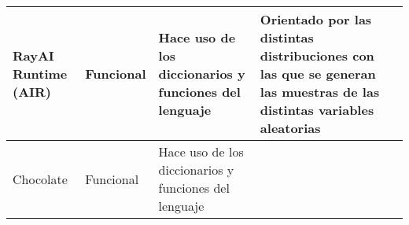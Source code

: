 \begin{longtable}{  p{2.15cm}  p{2.4cm}  p{4.75cm}  p{4.65cm}  p{5.45cm} }
    RayAI Runtime (AIR)                                                                                                                                                                                                                                                                                                          &
    Funcional                                                                                                                                                                                                                                                                                                                    &
    Hace uso de los diccionarios y funciones del lenguaje                                                                                                                                                                                                                                                                        &
    Orientado por las distintas distribuciones con las que se generan las muestras de las distintas variables aleatorias                                                                                                                                                                                                         &
    \\
    \hline
    Chocolate                                                                                                                                                                                                                                                                                                                    &
    Funcional                                                                                                                                                                                                                                                                                                                    &
    Hace uso de los diccionarios y funciones del lenguaje                                                                                                                                                                                                                                                                        &

\end{longtable}
